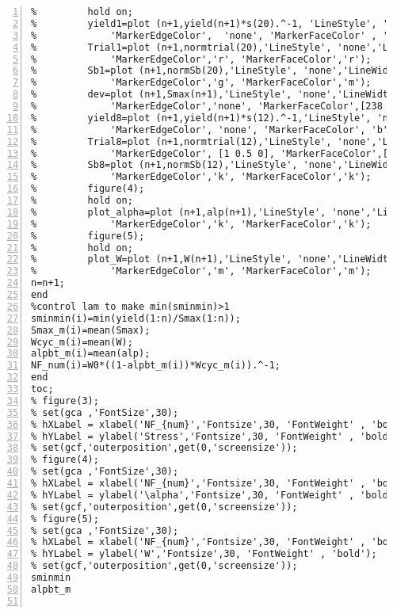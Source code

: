 \begin{lstlisting}[numbers=left, numberstyle=\tiny, keywordstyle=\color{blue!100}, commentstyle=\color{red!30!green!100!blue!100}, frame=shadowbox, rulesepcolor=\color{red!20!green!20!blue!20}]
%         figure(3);
%         hold on;
%         yield1=plot (n+1,yield(n+1)*s(20).^-1, 'LineStyle', 'none','LineWidth', 1, 'Marker', 'o', 'MarkerSize', 8, ...
%             'MarkerEdgeColor',  'none', 'MarkerFaceColor' , 'c');
%         Trial1=plot (n+1,normtrial(20),'LineStyle', 'none','LineWidth', 1,'Marker', '^', 'MarkerSize', 10, ...
%             'MarkerEdgeColor','r', 'MarkerFaceColor','r');
%         Sb1=plot (n+1,normSb(20),'LineStyle', 'none','LineWidth', 1,'Marker', 'v', 'MarkerSize', 10, ...
%             'MarkerEdgeColor','g', 'MarkerFaceColor','m');
%         dev=plot (n+1,Smax(n+1),'LineStyle', 'none','LineWidth', 1,'Marker', 's', 'MarkerSize', 11, ...
%             'MarkerEdgeColor','none', 'MarkerFaceColor',[238 18 137]/255);
%         yield8=plot (n+1,yield(n+1)*s(12).^-1,'LineStyle', 'none','LineWidth', 1,'Marker', 'o', 'MarkerSize', 8, ...
%             'MarkerEdgeColor', 'none', 'MarkerFaceColor', 'b');
%         Trial8=plot (n+1,normtrial(12),'LineStyle', 'none','LineWidth', 1,'Marker', '^', 'MarkerSize', 10, ...
%             'MarkerEdgeColor', [1 0.5 0], 'MarkerFaceColor',[1 0.5 0]);
%         Sb8=plot (n+1,normSb(12),'LineStyle', 'none','LineWidth', 1,'Marker', 'v', 'MarkerSize', 10, ...
%             'MarkerEdgeColor','k', 'MarkerFaceColor','k');
%         figure(4);
%         hold on;
%         plot_alpha=plot (n+1,alp(n+1),'LineStyle', 'none','LineWidth', 1,'Marker', 's', 'MarkerSize', 10, ...
%             'MarkerEdgeColor','k', 'MarkerFaceColor','k');
%         figure(5);
%         hold on;
%         plot_W=plot (n+1,W(n+1),'LineStyle', 'none','LineWidth', 1,'Marker', 'o', 'MarkerSize', 10, ...
%             'MarkerEdgeColor','m', 'MarkerFaceColor','m');
n=n+1;
end
%control lam to make min(sminmin)>1
sminmin(i)=min(yield(1:n)/Smax(1:n));
Smax_m(i)=mean(Smax);
Wcyc_m(i)=mean(W);
alpbt_m(i)=mean(alp);
NF_num(i)=W0*((1-alpbt_m(i))*Wcyc_m(i)).^-1;
end
toc;
% figure(3);
% set(gca ,'FontSize',30);
% hXLabel = xlabel('NF_{num}','Fontsize',30, 'FontWeight' , 'bold');
% hYLabel = ylabel('Stress','Fontsize',30, 'FontWeight' , 'bold');
% set(gcf,'outerposition',get(0,'screensize'));
% figure(4);
% set(gca ,'FontSize',30);
% hXLabel = xlabel('NF_{num}','Fontsize',30, 'FontWeight' , 'bold');
% hYLabel = ylabel('\alpha','Fontsize',30, 'FontWeight' , 'bold');
% set(gcf,'outerposition',get(0,'screensize'));
% figure(5);
% set(gca ,'FontSize',30);
% hXLabel = xlabel('NF_{num}','Fontsize',30, 'FontWeight' , 'bold');
% hYLabel = ylabel('W','Fontsize',30, 'FontWeight' , 'bold');
% set(gcf,'outerposition',get(0,'screensize'));
sminmin
alpbt_m


\end{lstlisting}
